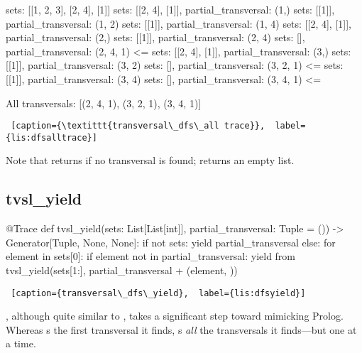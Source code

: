 \begin{minipage}{\linewidth}  \largev  \hrulefill  
\begin{python}
sets: [[1, 2, 3], [2, 4], [1]]
  sets: [[2, 4], [1]], partial_transversal: (1,)
    sets: [[1]], partial_transversal: (1, 2)
    sets: [[1]], partial_transversal: (1, 4)
  sets: [[2, 4], [1]], partial_transversal: (2,)
    sets: [[1]], partial_transversal: (2, 4)
      sets: [], partial_transversal: (2, 4, 1) <=
  sets: [[2, 4], [1]], partial_transversal: (3,)
    sets: [[1]], partial_transversal: (3, 2)
      sets: [], partial_transversal: (3, 2, 1) <=
    sets: [[1]], partial_transversal: (3, 4)
      sets: [], partial_transversal: (3, 4, 1) <=

All transversals: [(2, 4, 1), (3, 2, 1), (3, 4, 1)]
\end{python}
\begin{lstlisting} [caption={\textittt{transversal\_dfs\_all trace}},  label={lis:dfsalltrace}]
\end{lstlisting}
\end{minipage}

Note that  returns  if no transversal is found;  returns an empty list.


\subsection{tvsl\_yield}

\begin{minipage}{\linewidth} \largev   \hrulefill
\begin{python}[numbers=left]
@Trace
def tvsl_yield(sets: List[List[int]], partial_transversal: Tuple = ()) -> Generator[Tuple, None, None]:
  if not sets:
    yield partial_transversal
  else:
    for element in sets[0]:
      if element not in partial_transversal:
        yield from tvsl_yield(sets[1:], partial_transversal + (element, ))
\end{python}
\begin{lstlisting} [caption={transversal\_dfs\_yield},  label={lis:dfsyield}]
\end{lstlisting}
\end{minipage}

\smallv

, although quite similar to , takes a significant step toward mimicking Prolog. Whereas  s the first transversal it finds,  s \textit{all} the transversals it finds---but one at a time.  


